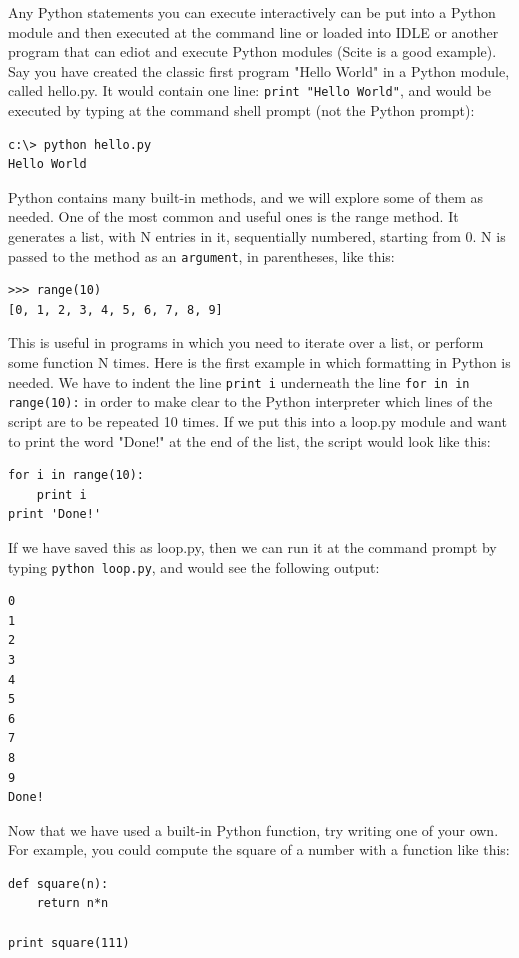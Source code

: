 Any Python statements you can execute interactively can be put into a Python module and then executed at the command line or loaded into IDLE or another program that can ediot and execute Python modules (Scite is a good example).  Say you have created the classic first program "Hello World" in a Python module, called hello.py.  It would contain one line: \verb#print "Hello World"#, and would be executed by typing at the command shell prompt (not the Python prompt):

\begin{lstlisting}
c:\> python hello.py
Hello World
\end{lstlisting}

Python contains many built-in methods, and we will explore some of them as needed.  One of the most common and useful ones is the range method.  It generates a list, with N entries in it, sequentially numbered, starting from 0.  N is passed to the method as an \verb#argument#, in parentheses, like this:

\begin{lstlisting}
>>> range(10)
[0, 1, 2, 3, 4, 5, 6, 7, 8, 9]
\end{lstlisting}

This is useful in programs in which you need to iterate over a list, or perform some function N times.  Here is the first example in which formatting in Python is needed.  We have to indent the line \verb#print i# underneath the line \verb#for in in range(10):# in order to make clear to the Python interpreter which lines of the script are to be repeated 10 times.  If we put this into a loop.py module and want to print the word "Done!" at the end of the list, the script would look like this:

\begin{lstlisting}
for i in range(10):
	print i
print 'Done!'
\end{lstlisting}

If we have saved this as loop.py, then we can run it at the command prompt by typing \verb#python loop.py#, and would see the following output:

\begin{lstlisting}
0
1
2
3
4
5
6
7
8
9
Done!
\end{lstlisting}



Now that we have used a built-in Python function, try writing one of your own.  For example, you could compute the square of a number with a function like this:

\begin{lstlisting}
def square(n):
	return n*n

print square(111)
\end{lstlisting}

